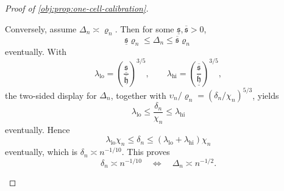\begin{proof}[Proof of \cref{obj:prop:one-cell-calibration}]
\begin{enumerate}
Conversely, assume \(\Delta_n\asymp\varrho_n\).  Then for some
\(\underline{\mathfrak s},\overline{\mathfrak s}>0\),
\[
\underline{\mathfrak s}\varrho_n
\le
\Delta_n
\le
\overline{\mathfrak s}\varrho_n
\]
eventually.  With
\[
\lambda_{\mathrm{lo}}
=
\left(\frac{\underline{\mathfrak s}}{\overline{\mathfrak h}}\right)^{3/5},
\qquad
\lambda_{\mathrm{hi}}
=
\left(\frac{\overline{\mathfrak s}}{\underline{\mathfrak h}}\right)^{3/5},
\]
the two-sided display for \(\Delta_n\), together with
\(\upsilon_n/\varrho_n=(\delta_n/\chi_n)^{5/3}\), yields
\[
\lambda_{\mathrm{lo}}
\le
\frac{\delta_n}{\chi_n}
\le
\lambda_{\mathrm{hi}}
\]
eventually.  Hence
\[
\lambda_{\mathrm{lo}}\chi_n
\le
\delta_n
\le
(\lambda_{\mathrm{lo}}+\lambda_{\mathrm{hi}})\chi_n
\]
eventually, which is \(\delta_n\asymp n^{-1/10}\).  This proves
\[
\delta_n\asymp n^{-1/10}
\quad\Longleftrightarrow\quad
\Delta_n\asymp n^{-1/2}.
\]
\end{enumerate}
\end{proof}

